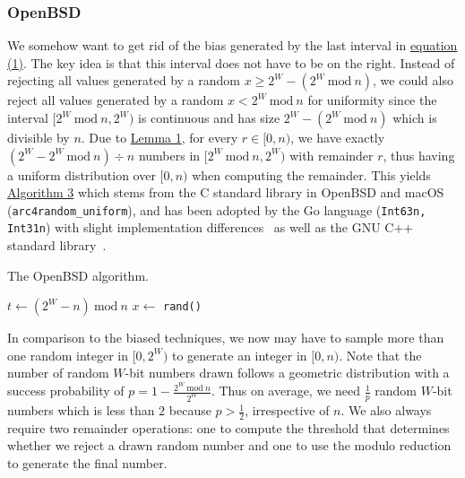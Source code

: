 \documentclass[a4paper, UKenglish, cleveref, autoref, thm-restate]{lipics-v2021}
\newcommand{\Mod}[1]{\ \mathrm{mod}\ #1}
\begin{document}
\subsubsection{OpenBSD}\label{sec:2.2.1}
We somehow want to get rid of the bias generated by the last interval in \hyperref[eq:1]{equation (1)}.
The key idea is that this interval does not have to be on the right.
Instead of rejecting all values generated by a random $x \geq 2^W - (2^W \Mod n)$, we could also reject all values generated by a random $x < 2^W \Mod n$ for uniformity since the interval $[2^W \Mod n, 2^W)$ is continuous and has size $2^W - (2^W \Mod n)$ which is divisible by $n$.
Due to \hyperref[lemma:1]{Lemma 1}, for every $r \in [0,n)$, we have exactly $(2^W - 2^W \Mod n) \div n$ numbers in $[2^W \Mod n,2^W)$ with remainder $r$, thus having a uniform distribution over $[0,n)$ when computing the remainder.
This yields \hyperref[alg:openbsd]{Algorithm 3} which stems from the C standard library in OpenBSD and macOS (\texttt{arc4random\_uniform}), and has been adopted by the Go language (\texttt{Int63n, Int31n}) with slight implementation differences~\cite{GoLang} as well as the GNU C++ standard library~\cite{GnuCpp}.

\begin{algorithm}[!htb] \label{alg:openbsd}
    \caption{The OpenBSD algorithm.}
    \Require{source of uniformly-distributed random integers in $[0,2^W)$ given by \texttt{rand()}}
    $t \leftarrow \left(2^W - n\right) \Mod n$\tcc*[r]{$ \left(2^W - n\right) \Mod n \equiv 2^W \Mod n$}
    $x \leftarrow$ \texttt{rand()}\;
    \KwRet{$x \Mod n$}\;
\end{algorithm}

In comparison to the biased techniques, we now may have to sample more than one random integer in $[0,2^W)$ to generate an integer in $[0,n)$.
Note that the number of random $W$-bit numbers drawn follows a geometric distribution with a success probability of $p = 1 - \frac{2^W \Mod n}{2^W}$.
Thus on average, we need $\frac{1}{p}$ random $W$-bit numbers which is less than $2$ because $p > \frac{1}{2}$, irrespective of $n$.
We also always require two remainder operations: one to compute the threshold that determines whether we reject a drawn random number and one to use the modulo reduction to generate the final number.
\end{document}
